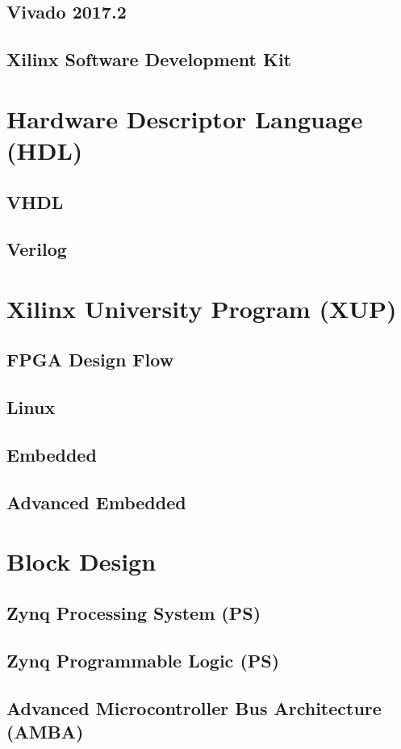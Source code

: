 \subsection{Vivado 2017.2}
\subsection{Xilinx Software Development Kit}
\section{Hardware Descriptor Language (HDL)}
\subsection{VHDL}
\subsection{Verilog}
\section{Xilinx University Program (XUP)}
\subsection{FPGA Design Flow}
\subsection{Linux}
\subsection{Embedded}
\subsection{Advanced Embedded}
\section{Block Design}
\subsection{Zynq Processing System (PS)}
\subsection{Zynq Programmable Logic (PS)}
\subsection{Advanced Microcontroller Bus Architecture (AMBA)}
